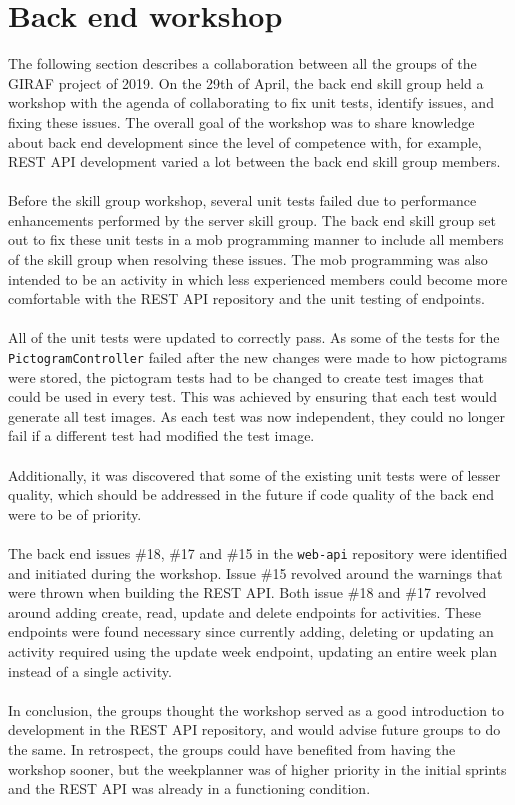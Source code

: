 \section{Back end workshop}
The following section describes a collaboration between all the groups of the GIRAF project of 2019. 
On the 29th of April, the back end skill group held a workshop with the agenda of collaborating to fix unit tests, identify issues, and fixing these issues. 
The overall goal of the workshop was to share knowledge about back end development since the level of competence with, for example, REST API development varied a lot between the back end skill group members.
\\\\
Before the skill group workshop, several unit tests failed due to performance enhancements performed by the server skill group.
The back end skill group set out to fix these unit tests in a mob programming manner to include all members of the skill group when resolving these issues.
The mob programming was also intended to be an activity in which less experienced members could become more comfortable with the REST API repository and the unit testing of endpoints.
\\\\
All of the unit tests were updated to correctly pass.
As some of the tests for the \texttt{PictogramController} failed after the new changes were made to how pictograms were stored, the pictogram tests had to be changed to create test images that could be used in every test.
This was achieved by ensuring that each test would generate all test images.
As each test was now independent, they could no longer fail if a different test had modified the test image.
\\\\
Additionally, it was discovered that some of the existing unit tests were of lesser quality, which should be addressed in the future if code quality of the back end were to be of priority.
\\\\
The back end issues \#18, \#17 and \#15 in the \texttt{web-api} repository were identified and initiated during the workshop.
Issue \#15 revolved around the warnings that were thrown when building the REST API.
Both issue \#18 and \#17 revolved around adding create, read, update and delete endpoints for activities.
These endpoints were found necessary since currently adding, deleting or updating an activity required using the update week endpoint, updating an entire week plan instead of a single activity. 
\\\\
In conclusion, the groups thought the workshop served as a good introduction to development in the REST API repository, and would advise future groups to do the same.
In retrospect, the groups could have benefited from having the workshop sooner, but the weekplanner was of higher priority in the initial sprints and the REST API was already in a functioning condition.
